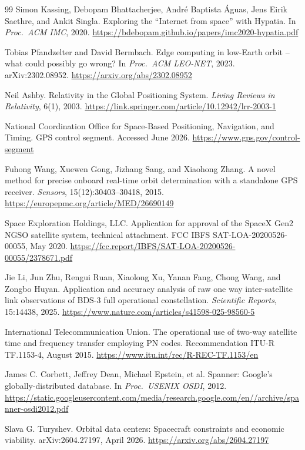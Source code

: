 \documentclass[twocolumn,10pt]{article}
\begin{document}
\begin{thebibliography}{99}
Simon Kassing, Debopam Bhattacherjee, Andr\'e Baptista \'Aguas, Jens Eirik Saethre, and Ankit Singla.
Exploring the ``Internet from space'' with Hypatia.
In \textit{Proc.\ ACM IMC}, 2020.
\url{https://bdebopam.github.io/papers/imc2020-hypatia.pdf}

Tobias Pfandzelter and David Bermbach.
Edge computing in low-Earth orbit -- what could possibly go wrong?
In \textit{Proc.\ ACM LEO-NET}, 2023. arXiv:2302.08952.
\url{https://arxiv.org/abs/2302.08952}

Neil Ashby.
Relativity in the Global Positioning System.
\textit{Living Reviews in Relativity}, 6(1), 2003.
\url{https://link.springer.com/article/10.12942/lrr-2003-1}

National Coordination Office for Space-Based Positioning, Navigation, and Timing.
GPS control segment.
Accessed June 2026.
\url{https://www.gps.gov/control-segment}

Fuhong Wang, Xuewen Gong, Jizhang Sang, and Xiaohong Zhang.
A novel method for precise onboard real-time orbit determination with a standalone GPS receiver.
\textit{Sensors}, 15(12):30403--30418, 2015.
\url{https://europepmc.org/article/MED/26690149}

Space Exploration Holdings, LLC.
Application for approval of the SpaceX Gen2 NGSO satellite system, technical attachment.
FCC IBFS SAT-LOA-20200526-00055, May 2020.
\url{https://fcc.report/IBFS/SAT-LOA-20200526-00055/2378671.pdf}

Jie Li, Jun Zhu, Rengui Ruan, Xiaolong Xu, Yanan Fang, Chong Wang, and Zongbo Huyan.
Application and accuracy analysis of raw one way inter-satellite link observations of BDS-3 full operational constellation.
\textit{Scientific Reports}, 15:14438, 2025.
\url{https://www.nature.com/articles/s41598-025-98560-5}

International Telecommunication Union.
The operational use of two-way satellite time and frequency transfer employing PN codes.
Recommendation ITU-R TF.1153-4, August 2015.
\url{https://www.itu.int/rec/R-REC-TF.1153/en}

James C. Corbett, Jeffrey Dean, Michael Epstein, et al.
Spanner: Google's globally-distributed database.
In \textit{Proc.\ USENIX OSDI}, 2012.
\url{https://static.googleusercontent.com/media/research.google.com/en//archive/spanner-osdi2012.pdf}

Slava G. Turyshev.
Orbital data centers: Spacecraft constraints and economic viability.
arXiv:2604.27197, April 2026.
\url{https://arxiv.org/abs/2604.27197}


\end{thebibliography}
\end{document}
